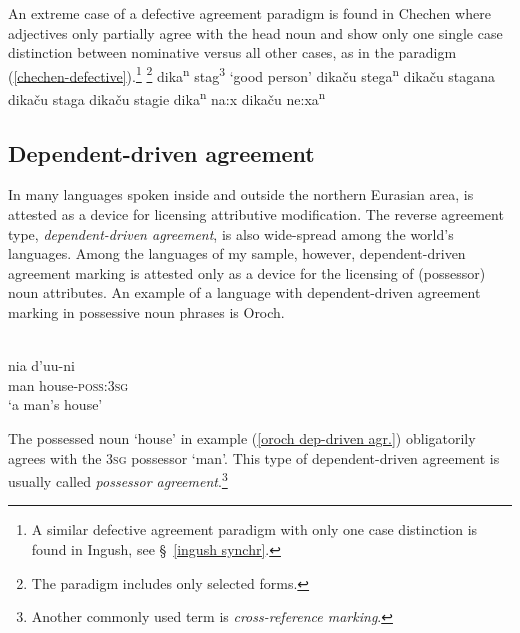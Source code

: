 An extreme case of a defective agreement paradigm is found in Chechen where adjectives only partially agree with the head noun and show only one single case distinction between nominative versus all other cases, as in the paradigm (\ref{chechen-defective}).\footnote{A similar defective agreement paradigm with only one case distinction is found in Ingush, see \S~\ref{ingush synchr}.}
\ea
\label{chechen-defective}
\footnote{The paradigm includes only selected forms.}
\ea dika\textsuperscript{n} stag\textsuperscript{3} \rm{‘good person’}		
\ex dikaču stega\textsuperscript{n} 								
\ex dikaču stagana 											
\ex dikaču staga 											
\ex dikaču stagie											
\ex dika\textsuperscript{n} na:x									
\ex dikaču ne:xa\textsuperscript{n}								
\zl
{}

\subsection{Dependent\hyp{}driven agreement}
In many languages spoken inside and outside the northern Eurasian area,  is attested as a device for licensing attributive modification. The reverse agreement type, \emph{dependent\hyp{}driven agreement}, is also wide-spread among the world's languages. Among the languages of my sample, however, dependent\hyp{}driven agreement marking is attested only as a device for the licensing of (possessor) noun attributes. An example of a language with dependent\hyp{}driven agreement marking in possessive noun phrases is Oroch.
\begin{exe}
\ex
\label{oroch dep-driven agr.}
\\
\gll 	nia	d'uu-ni\\
	man	house-\textsc{poss:3sg}\\
\glt	‘a man's house’
\end{exe}
The possessed noun ‘house’ in example (\ref{oroch dep-driven agr.}) obligatorily agrees with the \textsc{3sg} possessor ‘man’. This type of dependent\hyp{}driven agreement is usually called \emph{possessor agreement}.\footnote{Another commonly used term is \emph{cross-reference marking}.}

